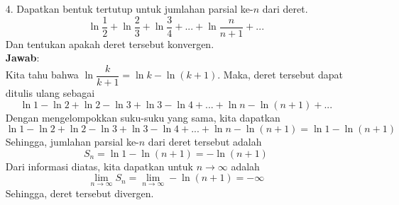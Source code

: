 \documentclass{article}
\newcommand{\jawab}{\textbf{Jawab}:}
\begin{document}
\begin{enumerate}
\begin{enumerate}
            \item[(m)] $\displaystyle \sum_{k=1}^{\infty} (e/\pi)^{k-1}$\\\\
            \jawab\\
            Kita tahu bahwa $(e/\pi)^{k-1} = \dfrac{e^{k-1}}{\pi^{k-1}} = \dfrac{\pi}{e}\cdot \dfrac{e^k}{\pi^k}$. Maka, deret tersebut dapat ditulis ulang sebagai
            \[\sum_{k=1}^{\infty} \dfrac{\pi}{e}\cdot \left(\dfrac{e}{\pi}\right)^{k} = \dfrac{\pi}{e}\sum_{k=1}^{\infty} \left(\dfrac{e}{\pi}\right)^k\]
            Deret $\displaystyle \sum_{k=1}^{\infty} \left(\dfrac{e}{\pi}\right)^k$ adalah deret geometri dengan $a = e/\pi$ dan $r = e/\pi$. Perhatikan bahwa $e=2,78...$ dan 
            $\pi=3,14...$, maka $e<\pi\implies \dfrac{e}{\pi}<1$. Karena $|r| < 1$, maka deret tersebut konvergen dan nilainya adalah
            \[\dfrac{\pi}{e}\sum_{k=1}^{\infty} \left(\dfrac{e}{\pi}\right)^k=\dfrac{\pi}{e}\cdot\frac{1}{1-\dfrac{e}{\pi}}=\dfrac{\pi}{e}\cdot\frac{\pi}{\pi-e}=\frac{\pi^2}{e\pi-e^2}\]
        \end{enumerate}
        \item[4.] Dapatkan bentuk tertutup untuk jumlahan parsial ke-$n$ dari deret.
        \[\ln\frac{1}{2}+\ln\frac{2}{3}+\ln\frac{3}{4}+...+\ln\frac{n}{n+1}+...\]
        Dan tentukan apakah deret tersebut konvergen.\\
        \jawab\\
        Kita tahu bahwa $\ln\dfrac{k}{k+1} = \ln k - \ln (k+1)$. Maka, deret tersebut dapat ditulis ulang sebagai
        \[\ln 1 - \ln 2 + \ln 2 - \ln 3 + \ln 3 - \ln 4 + ... + \ln n - \ln (n+1) + ...\]
        Dengan mengelompokkan suku-suku yang sama, kita dapatkan
        \[\ln 1 - \ln 2 + \ln 2 - \ln 3 + \ln 3 - \ln 4 + ... + \ln n - \ln (n+1) = \ln 1 - \ln (n+1)\]
        Sehingga, jumlahan parsial ke-$n$ dari deret tersebut adalah
        \[S_n = \ln 1 - \ln (n+1) = -\ln (n+1)\]
        Dari informasi diatas, kita dapatkan untuk $n\to\infty$ adalah
        \[\lim_{n\to\infty}S_n=\lim_{n\to\infty}-\ln (n+1)=-\infty\]
        Sehingga, deret tersebut divergen.


\end{enumerate}
\end{document}
